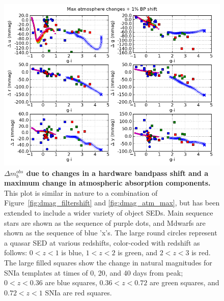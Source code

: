 \documentclass[12pt,preprint]{aastex}
\begin{document}
\begin{figure}
\centering
\includegraphics[width=6in]{dmag_all_max+shift}
\caption{{\small
{\bf $\Delta m_b^{obs}$ due to changes in a hardware bandpass shift
  and a maximum change in atmospheric absorption components.}  This
plot is similar in nature to a combination of
Figure~\ref{fig:dmag_filtershift} and \ref{fig:dmag_atm_max}, but has
been extended to include a wider variety of object SEDs. Main sequence
stars are shown as the sequence of purple dots, and Mdwarfs are
shown as the sequence of blue 'x's. The large round circles represent
a quasar SED at various redshifts, color-coded with redshift as
follows: $0<z<1$ is blue, $1<z<2$ is green, and $2<z<3$ is red. The
large filled squares show the change in natural magnitudes for SNIa
templates at times of 0, 20, and 40 days from peak; $0<z<0.36$ are
blue squares, $0.36<z<0.72$ are green squares, and $0.72<z<1$ SNIa are
red squares. 
}}
\label{fig:dmag_allseds}
\end{figure}




\end{document}
